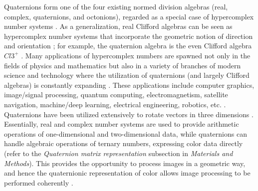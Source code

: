 \documentclass[superscriptaddress,longbibliography,aps,prl,twocolumn,10pt]{revtex4-2}
\begin{document}
Quaternions form one of the four existing normed division algebras (real, complex, quaternions, and octonions), regarded as a special case of hypercomplex number systems \cite{LeBihan2004}. As a generalization, real Clifford algebras \cite{Josipovi2019} can be seen as hypercomplex number systems that incorporate the geometric notion of direction and orientation \cite{deCastro2020}; for example, the quaternion algebra is the even Clifford algebra $Cl3^+$ \cite{Baez2001}. Many applications of hypercomplex numbers are spawned not only in the fields of physics and mathematics but also in a variety of branches of modern science and technology where the utilization of quaternions (and largely Clifford algebras) is constantly expanding \cite{Kharinov2018, Valous2020, Hitzer2023}. These applications include computer graphics, image/signal processing, quantum computing, electromagnetism, satellite navigation, machine/deep learning, electrical engineering, robotics, etc. \cite{Hitzer2013, Hitzer2023}. Quaternions have been utilized extensively to rotate vectors in three dimensions \cite{Goldman2011}. Essentially, real and complex number systems are used to provide arithmetic operations of one-dimensional and two-dimensional data, while quaternions can handle algebraic operations of ternary numbers, expressing color data directly \cite{SooChangPei1997} (refer to the \textit{Quaternion matrix representation} subsection in \textit{Materials and Methods}). This provides the opportunity to process images in a geometric way, and hence the quaternionic representation of color allows image processing to be performed coherently \cite{HitzerSangwine2013}.
\end{document}
